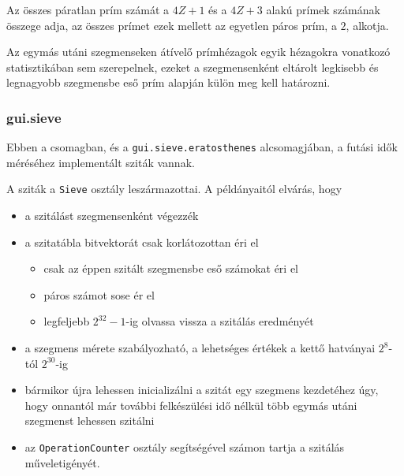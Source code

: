 Az összes páratlan prím számát a $4Z+1$ és a $4Z+3$ alakú prímek számának összege adja, az összes prímet ezek mellett az egyetlen páros prím, a $2$, alkotja.

Az egymás utáni szegmenseken átívelő prímhézagok egyik hézagokra vonatkozó statisztikában sem szerepelnek, ezeket a szegmensenként eltárolt legkisebb és legnagyobb szegmensbe eső prím alapján külön meg kell határozni.

\subsubsection{gui.sieve}

Ebben a csomagban, és a \texttt{gui.sieve.eratosthenes} alcsomagjában, a futási idők méréséhez implementált sziták vannak.

A sziták a \texttt{Sieve} osztály leszármazottai.
A példányaitól elvárás, hogy
\begin{itemize}
\item a szitálást szegmensenként végezzék
\item a szitatábla bitvektorát csak korlátozottan éri el
\begin{itemize}
\item csak az éppen szitált szegmensbe eső számokat éri el
\item páros számot sose ér el
\item legfeljebb $2^{32}-1$-ig olvassa vissza a szitálás eredményét
\end{itemize}
\item a szegmens mérete szabályozható, a lehetséges értékek a kettő hatványai $2^8$-tól $2^{30}$-ig 
\item bármikor újra lehessen inicializálni a szitát egy szegmens kezdetéhez úgy, hogy onnantól már további felkészülési idő nélkül több egymás utáni szegmenst lehessen szitálni
\item az \texttt{OperationCounter} osztály segítségével számon tartja a szitálás műveletigényét.
\end{itemize}

